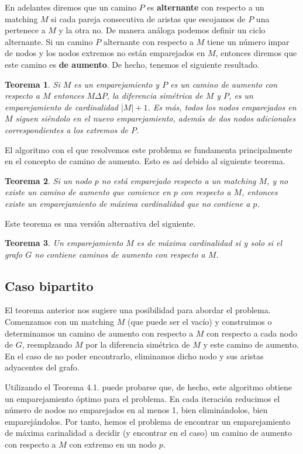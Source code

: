 \documentclass[twoside,12pt]{article}
\newtheorem{theorem}{Teorema}[section]
\begin{document}
En adelantes diremos que un camino $P$ es \textbf{alternante} con respecto a un matching $M$ si cada pareja consecutiva de aristas que escojamos de $P$ una pertenece a $M$ y la otra no. De manera análoga podemos definir un ciclo alternante. Si un camino $P$ alternante con respecto a $M$ tiene un número impar de nodos y los nodos extremos no están emparejados en $M$, entonces diremos que este camino es \textbf{de aumento}. De hecho, tenemos el siguiente resultado.
\begin{theorem}
Si $M$ es un emparejamiento y $P$ es un camino de aumento con respecto a $M$ entonces $M\Delta P$, la diferencia simétrica de $M$ y $P$, es un emparejamiento de cardinalidad $|M|+1$. Es más, todos los nodos emparejados en $M$ siguen siéndolo en el nuevo emparejamiento, además de dos nodos adicionales correspondientes a los extremos de $P$.
\end{theorem}  

El algoritmo con el que resolvemos este problema se fundamenta principalmente en el concepto de camino de aumento. Esto es así debido al siguiente teorema.
\begin{theorem}
Si un nodo $p$ no está emparejado respecto a un matching $M$, y no existe un camino de aumento que comience en $p$ con respecto a $M$, entonces existe un emparejamiento de máxima cardinalidad que no contiene a $p$.
\end{theorem}
Este teorema es una versión alternativa del siguiente.
\begin{theorem}
Un emparejamiento $M$ es de máxima cardinalidad si y solo si el grafo $G$ no contiene caminos de aumento con respecto a $M$.
\end{theorem}

\subsection{Caso bipartito}
El teorema anterior nos sugiere una posibilidad para abordar el problema. Comenzamos con un matching $M$ (que puede ser el vacío) y construimos o determinamos un camino de aumento con respecto a $M$ con respecto a cada nodo de $G$, reemplzando $M$ por la diferencia simétrica de $M$ y este camino de aumento. En el caso de no poder encontrarlo, eliminamos dicho nodo y sus aristas adyacentes del grafo.

Utilizando el Teorema 4.1. puede probarse que, de hecho, este algoritmo obtiene un emparejamiento óptimo para el problema. En cada iteración reducimos el número de nodos no emparejados en al menos 1, bien eliminándolos, bien emparejándolos. Por tanto, hemos el problema de encontrar un emparejamiento de máxima carinalidad a decidir (y encontrar en el caso) un camino de aumento con respecto a $M$ con extremo en un nodo $p$. 
\end{document}
